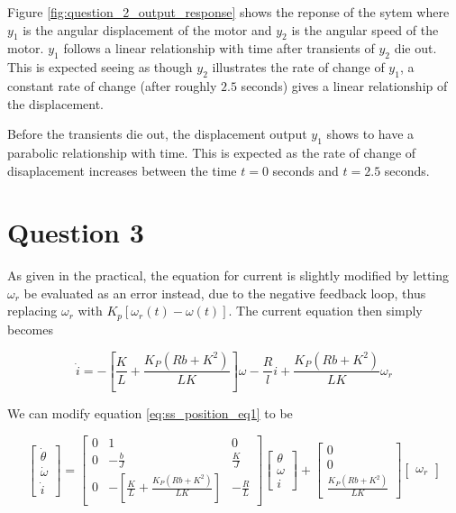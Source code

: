 \documentclass[a4paper, 12pt]{article}
\begin{document}
Figure \ref{fig:question_2_output_response} shows the reponse of the sytem where $y_1$ is the angular displacement of the motor and $y_2$ is the angular speed of the motor. $y_1$ follows a linear relationship with time after transients of $y_2$ die out. This is expected seeing as though $y_2$ illustrates the rate of change of $y_1$, a constant rate of change (after roughly $2.5$ seconds) gives a linear relationship of the displacement. 

Before the transients die out, the displacement output $y_1$ shows to have a parabolic relationship with time. This is expected as the rate of change of disaplacement increases between the time $t=0$ seconds and $t=2.5$ seconds.    


\section{Question 3}

As given in the practical, the equation for current is slightly modified by
letting $\omega_r$ be evaluated as an error instead, due to the negative
feedback loop, thus replacing $\omega_r$ with $K_p[\omega_r(t) - \omega(t)]$.
The current equation then simply becomes

\begin{equation}
	\dot i = -\left[ \frac{K}{L} + \frac{K_P(Rb + K^2)}{LK} \right]\omega - \frac{R}{l}i + \frac{K_P(Rb + K^2)}{LK}\omega_r
	\label{eq:3_current}
\end{equation}

We can modify equation \eqref{eq:ss_position_eq1} to be

\begin{equation}
  \left[
  \begin{array}{c}
    \dot \theta \\
    \dot \omega \\
    \dot i
  \end{array}
  \right]
  =
  \left[
  \begin{array}{ccc}
    0 & 1 & 0 \\
    0 & -\frac{b}{J} & \frac{K}{J} \\
    0 & -\left[ \frac{K}{L} + \frac{K_P(Rb + K^2)}{LK} \right] & -\frac{R}{L}
  \end{array}
  \right]
  \left[
  \begin{array}{c}
    \theta \\
    \omega \\
    i
  \end{array}
  \right]
  +
  \left[
  \begin{array}{c}
    0 \\
    0 \\
    \frac{K_P(Rb + K^2)}{LK}
  \end{array}
  \right]
  \left[
  \begin{array}{c}
    \omega_r
  \end{array}
  \right]
  \label{eq:3_ss_position}
\end{equation}
\end{document}
